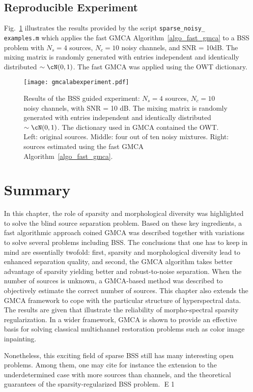 \subsection{Reproducible Experiment}
Fig.~\ref{fig:gmcalabexperiment} illustrates the results provided by the script {\tt sparse\_noisy\_\\examples.m} which applies the fast GMCA Algorithm~\ref{algo_fast_gmca} to a BSS problem with $N_s=4$ sources, $N_c=10$ noisy channels, and SNR = 10dB. The mixing matrix is randomly generated with entries independent and identically distributed $\sim \cN(0,1)$. The fast GMCA was applied using the OWT dictionary.
 
\begin{figure}[htb]
\centerline{\texttt{[image: gmcalabexperiment.pdf]}}
\caption{Results of the BSS guided experiment: $N_s=4$ sources, $N_c=10$ noisy channels, with SNR = 10 dB. The mixing matrix is randomly generated with entries independent and identically distributed $\sim \cN(0,1)$. The dictionary used in GMCA contained the OWT. Left: original sources. Middle: four out of ten noisy mixtures. Right: sources estimated using the fast GMCA Algorithm~\ref{algo_fast_gmca}.} 
\label{fig:gmcalabexperiment}
\end{figure} 

\section{Summary}
In this chapter, the role of sparsity and morphological diversity was highlighted to solve the blind source separation problem. Based on these key ingredients, a fast algorithmic approach coined GMCA was described together with variations to solve several problems including BSS. The conclusions that one has to keep in mind are essentially twofold: first, sparsity and morphological diversity lead to enhanced separation quality, and second, the GMCA algorithm takes better advantage of sparsity yielding better and robust-to-noise separation. When the number of sources is unknown, a GMCA-based method was described to objectively estimate the correct number of sources. This chapter also extends the GMCA framework to cope with the particular structure of hyperspectral data. The results are given that illustrate the reliability of morpho-spectral sparsity regularization. In a wider framework, GMCA is shown to provide an effective basis for solving classical multichannel restoration problems such as color image inpainting. 

Nonetheless, this exciting field of sparse BSS still has many interesting open problems. Among them, one may cite for instance the extension to the underdetermined case with more sources than channels, and the theoretical guarantees of the sparsity-regularized BSS problem. 
E 1
